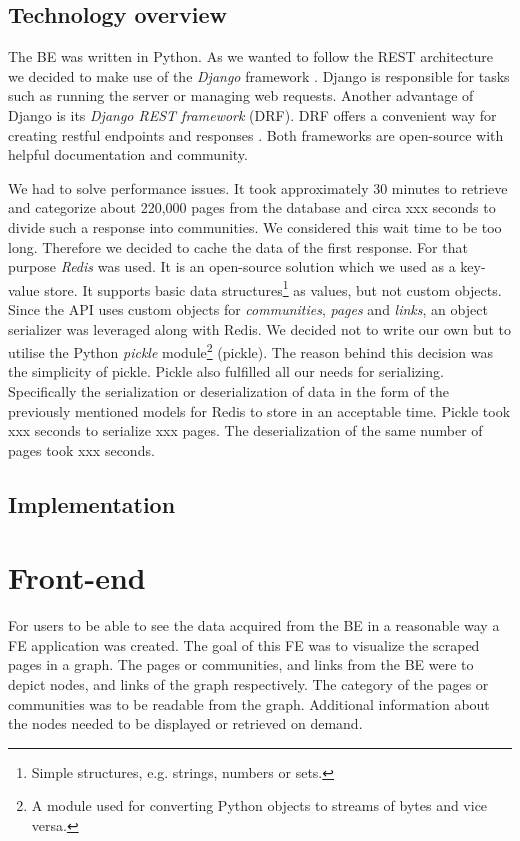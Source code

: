 \subsection{Technology overview}
\label{technologyOverview}
The BE was written in Python. As we wanted to follow the REST architecture we decided to make use of the \textit{Django} framework \cite{meetDjango}. Django is responsible for tasks such as running the server or managing web requests. Another advantage of Django is its \textit{Django REST framework} (DRF). DRF offers a convenient way for creating restful endpoints and responses \cite{djangoRest}. Both frameworks are open-source with helpful documentation and community. 

We had to solve performance issues. It took approximately 30 minutes to retrieve and categorize about 220,000 pages from the database and circa xxx seconds to divide such a response into communities. We considered this wait time to be too long. Therefore we decided to cache the data of the first response. For that purpose \textit{Redis} \cite{redis} was used. It is an open-source solution which we used as a key-value store. It supports basic data structures\footnote{Simple structures, e.g. strings, numbers or sets.} as values, but not custom objects. Since the API uses custom objects for \textit{communities}, \textit{pages} and \textit{links}, an object serializer was leveraged along with Redis. We decided not to write our own but to utilise the Python \textit{pickle} module\footnote{A module used for converting Python objects to streams of bytes and vice versa.} \cite{pickle} (pickle). The reason behind this decision was the simplicity of pickle. Pickle also fulfilled all our needs for serializing. Specifically the serialization or deserialization of data in the form of the previously mentioned models for Redis to store in an acceptable time. Pickle took xxx seconds to serialize xxx pages. The deserialization of the same number of pages took xxx seconds.

\subsection{Implementation} \label{APIImplementation}


\section{Front-end}
For users to be able to see the data acquired from the BE in a reasonable way a FE application was created. The goal of this FE was to visualize the scraped pages in a graph. The pages or communities, and links from the BE were to depict nodes, and links of the graph respectively. The category of the pages or communities was to be readable from the graph. Additional information about the nodes needed to be displayed or retrieved on demand.

